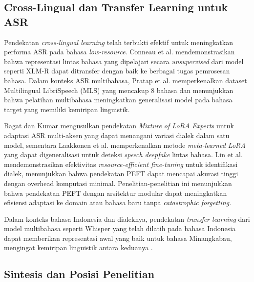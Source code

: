 \subsection{Cross-Lingual dan Transfer Learning untuk ASR}

Pendekatan \textit{cross-lingual learning} telah terbukti efektif untuk meningkatkan performa ASR pada bahasa \textit{low-resource}. Conneau et al. \cite{conneau2020unsupervised} mendemonstrasikan bahwa representasi lintas bahasa yang dipelajari secara \textit{unsupervised} dari model seperti XLM-R dapat ditransfer dengan baik ke berbagai tugas pemrosesan bahasa. Dalam konteks ASR multibahasa, Pratap et al. \cite{pratap2020mls} memperkenalkan dataset Multilingual LibriSpeech (MLS) yang mencakup 8 bahasa dan menunjukkan bahwa pelatihan multibahasa meningkatkan generalisasi model pada bahasa target yang memiliki kemiripan linguistik.

Bagat dan Kumar \cite{bagat2025mixture} mengusulkan pendekatan \textit{Mixture of LoRA Experts} untuk adaptasi ASR multi-aksen yang dapat menangani variasi dialek dalam satu model, sementara Laakkonen et al. \cite{laakkonen2025generalizable} memperkenalkan metode \textit{meta-learned LoRA} yang dapat digeneralisasi untuk deteksi \textit{speech deepfake} lintas bahasa. Lin et al. \cite{lin2025dialect} mendemonstrasikan efektivitas \textit{resource-efficient fine-tuning} untuk identifikasi dialek, menunjukkan bahwa pendekatan PEFT dapat mencapai akurasi tinggi dengan overhead komputasi minimal. Penelitian-penelitian ini menunjukkan bahwa pendekatan PEFT dengan arsitektur modular dapat meningkatkan efisiensi adaptasi ke domain atau bahasa baru tanpa \textit{catastrophic forgetting}.

Dalam konteks bahasa Indonesia dan dialeknya, pendekatan \textit{transfer learning} dari model multibahasa seperti Whisper yang telah dilatih pada bahasa Indonesia dapat memberikan representasi awal yang baik untuk bahasa Minangkabau, mengingat kemiripan linguistik antara keduanya \cite{sovia2022minangkabau}.

\subsection{Sintesis dan Posisi Penelitian}

